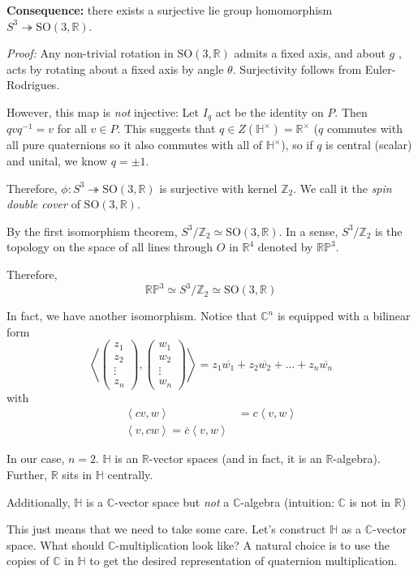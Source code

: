 \documentclass[12pt]{article}
\newcommand{\R}{\mathbb{R}}
\newcommand{\Z}{\mathbb{Z}}
\newcommand{\C}{\mathbb{C}}
\renewcommand{\H}{\mathbb{H}}
\newcommand{\RP}{\mathbb{RP}}
\newcommand{\brak}[1]{\left\langle #1 \right\rangle}
\newcommand{\SO}{\text{SO}}
\renewcommand{\bar}{\overline}
\begin{document}
    \textbf{Consequence:} there exists a surjective lie group homomorphism $S^3 \twoheadrightarrow \SO(3, \R)$. 

    \emph{Proof:} Any non-trivial rotation in $\SO(3, \R)$ admits a fixed axis, and about $g$ , acts by rotating about a fixed axis by angle $\theta$. Surjectivity follows from Euler-Rodrigues. 

    However, this map is \emph{not} injective: Let $I_q$ act be the identity on $P$. Then $qvq^{-1} = v$
    for all $v \in P$. This suggests that $q \in Z(\H^{\times}) = \R^{\times}$ ($q$ commutes with all pure quaternions so it also commutes with all of $\H^{\times}$), so if $q$ is central (scalar) and unital, we know $q = \pm 1$. 

    Therefore, $\phi: S^3 \twoheadrightarrow \SO(3, \R)$ is surjective with kernel $\Z_2$. We call it the \emph{spin double cover} of $\SO(3, \R)$. 

    By the first isomorphism theorem, $S^3/\Z_2 \simeq \SO(3, \R)$. In a sense, $S^3/\Z_2$ is the topology on the space of all lines through $O$ in $\R^4$ denoted by $\RP^3$.
    
    Therefore,
    \[\RP^3 \simeq S^3/\Z_2 \simeq \SO(3, \R)\]

    In fact, we have another isomorphism. Notice that $\C^n$ is equipped with a bilinear form 
    \[\brak{\begin{pmatrix}
        z_1\\z_2\\ \vdots\\ z_n
    \end{pmatrix}, \begin{pmatrix}
        w_1\\w_2\\ \vdots\\ w_n
    \end{pmatrix}} = z_1 \bar{w_1} + z_2 \bar{w_2} + \dots + z_n \bar{w_n}\]
    with
    \begin{align*}
        \brak{cv, w} &= c\brak{v, w}\\ 
        \brak{v, cw} = \bar c\brak{v, w}
    \end{align*}

    In our case, $n = 2$. $\H$ is an $\R$-vector spaces (and in fact, it is an $\R$-algebra). Further, $\R$ sits in $\H$ centrally. 

    Additionally, $\H$ is a $\C$-vector space but \emph{not} a $\C$-algebra (intuition: $\C$ is not in $\R$) 

    This just means that we need to take some care. Let's construct $\H$ as a $\C$-vector space. What should $\C$-multiplication look like? A natural choice is to use the copies of $\C$ in $\H$ to get the desired representation of quaternion multiplication. 
\end{document}
